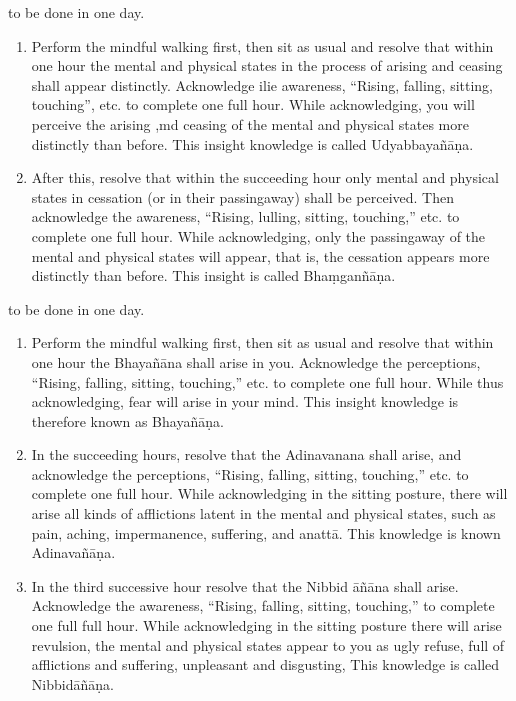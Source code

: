 \documentclass[a5paper,10pt,english]{book}
\begin{document}
\sphinxAtStartPar
{} to be done in one day.
\begin{enumerate}
%
\item {} 
\sphinxAtStartPar
Perform the mindful walking first, then sit as usual and resolve that within one hour the mental and physical states in the process of arising and ceasing shall appear distinctly. Acknowledge ilie awareness, “Rising, falling, sitting, touching”, etc. to complete one full hour. While acknowledging, you will perceive the arising ,md ceasing of the mental and physical states more distinctly than before. This insight knowledge is called Udyabbayañāṇa.

\item {} 
\sphinxAtStartPar
After this, resolve that within the succeeding hour only mental and physical states in cessation (or in their passing\sphinxhyphen{}away) shall be perceived. Then acknowledge the awareness, “Rising, lulling, sitting, touching,” etc. to complete one full hour. While acknowledging, only the passing\sphinxhyphen{}away of the mental and physical states will appear, that is, the cessation appears more distinctly than before. This insight is called Bhaṃganñāṇa.

\end{enumerate}

\sphinxAtStartPar
{} to be done in one day.
\begin{enumerate}
%
\item {} 
\sphinxAtStartPar
Perform the mindful walking first, then sit as usual and resolve that within one hour the Bhayañāna shall arise in you. Acknowledge the perceptions, “Rising, falling, sitting, touching,” etc. to complete one full hour. While thus acknowledging, fear will arise in your mind. This insight knowledge is therefore known as Bhayañāṇa.

\item {} 
\sphinxAtStartPar
In the succeeding hours, resolve that the Adinavanana shall arise, and acknowledge the perceptions, “Rising, falling, sitting, touching,” etc. to complete one full hour. While acknowledging in the sitting posture, there will arise all kinds of afflictions latent in the mental and physical states, such as pain, aching, impermanence, suffering, and anattā. This knowledge is known Adinavañāṇa.

\item {} 
\sphinxAtStartPar
In the third successive hour resolve that the Nibbid āñāna shall arise. Acknowledge the awareness, “Rising, falling, sitting, touching,” to complete one full full hour. While acknowledging in the sitting posture there will arise revulsion, the mental and physical states appear to you as ugly refuse, full of afflictions and suffering, unpleasant and disgusting, This knowledge is called Nibbidāñāṇa.

\end{enumerate}
\end{document}
